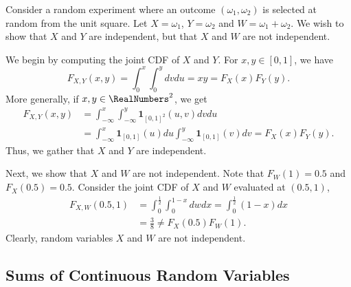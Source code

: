 \begin{example}
Consider a random experiment where an outcome $(\omega_1, \omega_2)$ is selected at random from the unit square.
Let $X = \omega_1$, $Y = \omega_2$ and $W = \omega_1 + \omega_2$.
We wish to show that $X$ and $Y$ are independent, but that $X$ and $W$ are not independent.

We begin by computing the joint CDF of $X$ and $Y$.
For $x,y \in [0,1]$, we have
\begin{equation*}
F_{X,Y}(x,y) = \int_0^{x} \int_0^{y} dv du
= x y = F_X(x) F_Y(y) .
\end{equation*}
More generally, if $x, y \in \RealNumbers^2$, we get
\begin{equation*}
\begin{split}
F_{X,Y}(x,y)
&= \int_{-\infty}^{x} \int_{-\infty}^{y}
\mathbf{1}_{[0,1]^2} (u, v) dv du \\
&= \int_{-\infty}^{x} \mathbf{1}_{[0,1]} (u) du
\int_{-\infty}^{y} \mathbf{1}_{[0,1]} (v) dv
= F_X(x) F_Y(y) .
\end{split}
\end{equation*}
Thus, we gather that $X$ and $Y$ are independent.

Next, we show that $X$ and $W$ are not independent.
Note that $F_W (1) = 0.5$ and $F_X (0.5) = 0.5$.
Consider the joint CDF of $X$ and $W$ evaluated at $(0.5, 1)$,
\begin{equation*}
\begin{split}
F_{X,W} (0.5, 1)
&= \int_{0}^{\frac{1}{2}} \int_{0}^{1-x} dw dx
= \int_{0}^{\frac{1}{2}} (1 - x) dx \\
&= \frac{3}{8}
\neq F_X (0.5) F_W(1) .
\end{split}
\end{equation*}
Clearly, random variables $X$ and $W$ are not independent.
\end{example}


\subsection{Sums of Continuous Random Variables}

